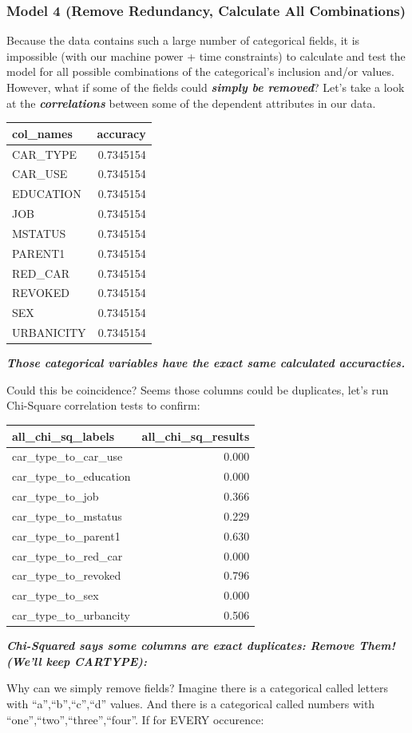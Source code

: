 \documentclass[]{article}
\begin{document}
\subsubsection{Model 4 (Remove Redundancy, Calculate All
Combinations)}\label{model-4-remove-redundancy-calculate-all-combinations}

Because the data contains such a large number of categorical fields, it
is impossible (with our machine power + time constraints) to calculate
and test the model for all possible combinations of the categorical's
inclusion and/or values. However, what if some of the fields could
\textbf{\emph{simply be removed}}? Let's take a look at the
\textbf{\emph{correlations}} between some of the dependent attributes in
our data.

\begin{longtable}[c]{@{}lr@{}}
\toprule
col\_names & accuracy\tabularnewline
\midrule
\endhead
CAR\_TYPE & 0.7345154\tabularnewline
CAR\_USE & 0.7345154\tabularnewline
EDUCATION & 0.7345154\tabularnewline
JOB & 0.7345154\tabularnewline
MSTATUS & 0.7345154\tabularnewline
PARENT1 & 0.7345154\tabularnewline
RED\_CAR & 0.7345154\tabularnewline
REVOKED & 0.7345154\tabularnewline
SEX & 0.7345154\tabularnewline
URBANICITY & 0.7345154\tabularnewline
\bottomrule
\end{longtable}

\textbf{\emph{Those categorical variables have the exact same calculated
accuracties.}}

Could this be coincidence? Seems those columns could be duplicates,
let's run Chi-Square correlation tests to confirm:

\begin{longtable}[c]{@{}lr@{}}
\toprule
all\_chi\_sq\_labels & all\_chi\_sq\_results\tabularnewline
\midrule
\endhead
car\_type\_to\_car\_use & 0.000\tabularnewline
car\_type\_to\_education & 0.000\tabularnewline
car\_type\_to\_job & 0.366\tabularnewline
car\_type\_to\_mstatus & 0.229\tabularnewline
car\_type\_to\_parent1 & 0.630\tabularnewline
car\_type\_to\_red\_car & 0.000\tabularnewline
car\_type\_to\_revoked & 0.796\tabularnewline
car\_type\_to\_sex & 0.000\tabularnewline
car\_type\_to\_urbancity & 0.506\tabularnewline
\bottomrule
\end{longtable}

\textbf{\emph{Chi-Squared says some columns are exact duplicates: Remove
Them! (We'll keep CARTYPE):}}

Why can we simply remove fields? Imagine there is a categorical called
letters with ``a'',``b'',``c'',``d'' values. And there is a categorical
called numbers with ``one'',``two'',``three'',``four''. If for EVERY
occurence:
\end{document}
